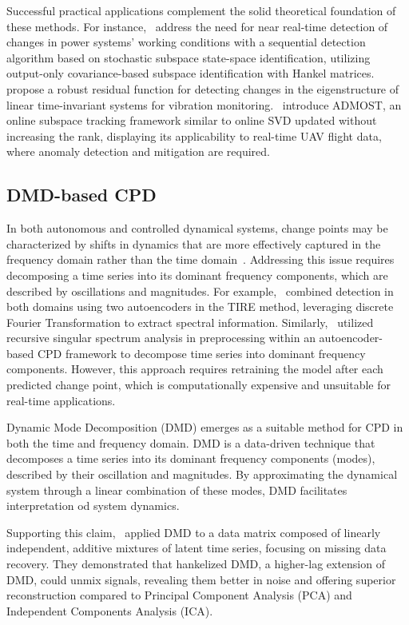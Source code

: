 Successful practical applications complement the solid theoretical foundation of these methods. For instance,~\cite{Hosur2019} address the need for near real-time detection of changes in power systems' working conditions with a sequential detection algorithm based on stochastic subspace state-space identification, utilizing output-only covariance-based subspace identification with Hankel matrices.\ \cite{Dohler2013} propose a robust residual function for detecting changes in the eigenstructure of linear time-invariant systems for vibration monitoring.\ \cite{He2019} introduce ADMOST, an online subspace tracking framework similar to online SVD updated without increasing the rank, displaying its applicability to real-time UAV flight data, where anomaly detection and mitigation are required.

\subsection{DMD-based CPD}
In both autonomous and controlled dynamical systems, change points may be characterized by shifts in dynamics that are more effectively captured in the frequency domain rather than the time domain~\cite{DeRyck2021, Gupta2022}. Addressing this issue requires decomposing a time series into its dominant frequency components, which are described by oscillations and magnitudes. For example,~\cite{DeRyck2021} combined detection in both domains using two autoencoders in the TIRE method, leveraging discrete Fourier Transformation to extract spectral information. Similarly,~\cite{Gupta2022} utilized recursive singular spectrum analysis in preprocessing within an autoencoder-based CPD framework to decompose time series into dominant frequency components. However, this approach requires retraining the model after each predicted change point, which is computationally expensive and unsuitable for real-time applications.

Dynamic Mode Decomposition (DMD) emerges as a suitable method for CPD in both the time and frequency domain. DMD is a data-driven technique that decomposes a time series into its dominant frequency components (modes), described by their oscillation and magnitudes. By approximating the dynamical system through a linear combination of these modes, DMD facilitates interpretation od system dynamics.

Supporting this claim,~\cite{Prasadan2020} applied DMD to a data matrix composed of linearly independent, additive mixtures of latent time series, focusing on missing data recovery. They demonstrated that hankelized DMD, a higher-lag extension of DMD, could unmix signals, revealing them better in noise and offering superior reconstruction compared to Principal Component Analysis (PCA) and Independent Components Analysis (ICA).

